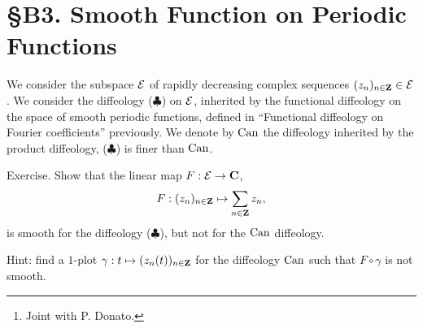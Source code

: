 
\chapter*{\S B3. Smooth Function on Periodic Functions}
\setcounter{footnote}{0}


\begin{abstract}
  This exercise%
  \footnote{Joint with P. Donato.}
  gives a simple example of a function on the space of rapidly decreasing sequences that is smooth for the functional diffeology,
  inherited by the smooth periodic functions,
  but not smooth for the ordinary product diffeology.%
\end{abstract}


We consider the subspace $\mathcal{E}$ of rapidly decreasing complex sequences  $(z_n)_{n\in\mathbf{Z}} \in \mathcal{E}$.
We consider the diffeology ($\clubsuit$) on $\mathcal{E}$,
inherited by the functional diffeology on the space of
smooth periodic functions,
defined in ``Functional diffeology on Fourier coefficients'' previously.
We denote by $\operatorname{Can}$ the diffeology inherited by the product diffeology,
($\clubsuit$) is finer than $\operatorname{Can}$.

\begin{Article}{Exercise.}{} Show that the linear map $F : \mathcal{E} \to \mathbf{C}$,
  $$
    F : (z_n)_{n\in\mathbf{Z}} \mapsto \sum_{n\in\mathbf{Z}} z_n,
    $$
  is smooth for the diffeology ($\clubsuit$),
  but not for the $\operatorname{Can}$ diffeology.
  
  Hint:
  find a $1$-plot $\gamma : t \mapsto (z_n(t))_{n\in\mathbf{Z}}$ for the diffeology $\operatorname{Can}$ such that $F \circ \gamma$ is not smooth.
\end{Article}

